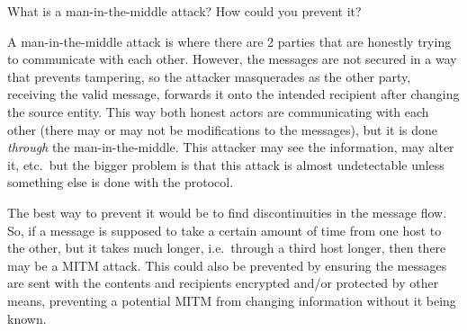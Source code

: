 \begin{questions}
\question{} What is a man-in-the-middle attack? How could you prevent it?
  \begin{solution}
    A man-in-the-middle attack is where there are 2 parties that are honestly trying to communicate with each other.
    However, the messages are not secured in a way that prevents tampering, so the attacker masquerades as the other party, receiving the valid message, forwards it onto the intended recipient after changing the source entity.
    This way both honest actors are communicating with each other (there may or may not be modifications to the messages), but it is done \emph{through} the man-in-the-middle.
    This attacker may see the information, may alter it, etc.\ but the bigger problem is that this attack is almost undetectable unless something else is done with the protocol.

    The best way to prevent it would be to find discontinuities in the message flow.
    So, if a message is supposed to take a certain amount of time from one host to the other, but it takes much longer, i.e.\ through a third host longer, then there may be a MITM attack.
    This could also be prevented by ensuring the messages are sent with the contents and recipients encrypted and/or protected by other means, preventing a potential MITM from changing information without it being known.
  \end{solution}


\end{questions}
